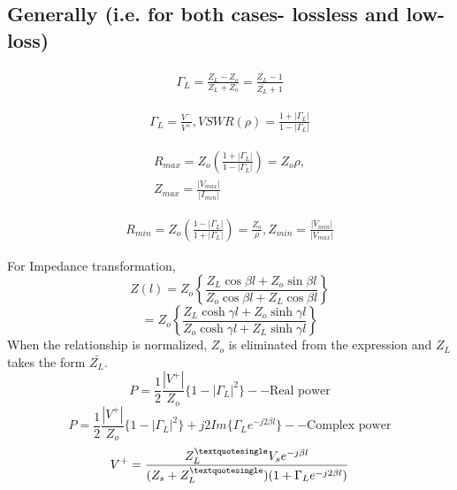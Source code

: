 \subsection*{Generally (i.e. for both cases- lossless and low-loss)}

\begin{align*}
\Gamma_L = \frac{Z_L - Z_o}{Z_L + Z_o} = \frac{\bar{Z_L} - 1}{\bar{Z_L} + 1}
\end{align*}

\begin{align*}
\Gamma_L = \frac{V^-}{V^+},
VSWR(\rho) = \frac{1 + |\Gamma_L
	|}{1 - |\Gamma_L|}
\end{align*}

\begin{align*}
R_{max} = Z_o \left( \frac{1 + |\Gamma_L
|}{1 - |\Gamma_L|}\right) = Z_o \rho,\\
Z_{max} = \frac{|V_{max}|}{|I_{min}|}
\end{align*}

\begin{align*}
R_{min} = Z_o \left(\frac{1 - |\Gamma_L|}{1 + |\Gamma_L|}\right) = \frac{Z_o}{\rho}, Z_{min} = \frac{|V_{min}|}{|V_{max}|}
\end{align*}

For Impedance transformation, 
$$Z(l) = Z_o\left\{\frac{Z_L\cos\beta l + Z_o\sin\beta l}{Z_o\cos\beta l + Z_L\cos\beta l}\right\} $$
$$= Z_o\left\{\frac{Z_L\cosh\gamma l + Z_o\sinh\gamma l}{Z_o\cosh\gamma l + Z_L\sinh\gamma l}\right\}	$$
When the relationship is normalized, $Z_o$ is eliminated from the expression and $Z_L$ takes the form $\bar{Z_L}$.
$$P = \frac{1}{2}\frac{|V^+|}{Z_o}\lbrace 1 - |\Gamma_L|^2\rbrace --\text{Real power}	$$
$$P = \frac{1}{2}\frac{|V^+|}{Z_o}\lbrace 1 - |\Gamma_L|^2\rbrace + j2Im\lbrace \Gamma_L e^{- j2\beta l}\rbrace --\text{Complex power}$$
$$V^+ = \dfrac{Z_L^{\textquotesingle}V_s e^{-j\beta l}}{(Z_s + Z_L^{\textquotesingle})(1 + \Gamma_L e^{-j2\beta
 l})}$$